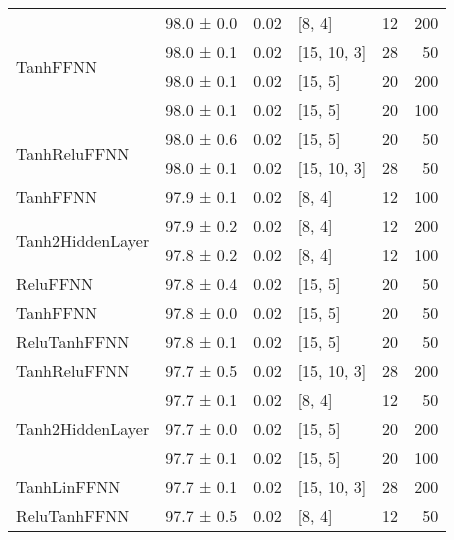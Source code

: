 \begin{longtable}{llrlrr}
 \hline
\multirow{4}{*}{TanhFFNN}           & 98.0 ± 0.0  &  0.02 & [8, 4]         &         12 &      200 \\
                                            & 98.0 ± 0.1  &  0.02 & [15, 10, 3]    &         28 &       50 \\
                                            & 98.0 ± 0.1  &  0.02 & [15, 5]        &         20 &      200 \\
                                            & 98.0 ± 0.1  &  0.02 & [15, 5]        &         20 &      100 \\
 \hline
\multirow{2}{*}{TanhReluFFNN}       & 98.0 ± 0.6  &  0.02 & [15, 5]        &         20 &       50 \\
                                            & 98.0 ± 0.1  &  0.02 & [15, 10, 3]    &         28 &       50 \\
 \hline
TanhFFNN                            & 97.9 ± 0.1  &  0.02 & [8, 4]         &         12 &      100 \\
 \hline
\multirow{2}{*}{Tanh2HiddenLayer}   & 97.9 ± 0.2  &  0.02 & [8, 4]         &         12 &      200 \\
                                            & 97.8 ± 0.2  &  0.02 & [8, 4]         &         12 &      100 \\
 \hline
ReluFFNN                            & 97.8 ± 0.4  &  0.02 & [15, 5]        &         20 &       50 \\
 \hline
TanhFFNN                            & 97.8 ± 0.0  &  0.02 & [15, 5]        &         20 &       50 \\
 \hline
ReluTanhFFNN                        & 97.8 ± 0.1  &  0.02 & [15, 5]        &         20 &       50 \\
 \hline
TanhReluFFNN                        & 97.7 ± 0.5  &  0.02 & [15, 10, 3]    &         28 &      200 \\
 \hline
\multirow{3}{*}{Tanh2HiddenLayer}   & 97.7 ± 0.1  &  0.02 & [8, 4]         &         12 &       50 \\
                                            & 97.7 ± 0.0  &  0.02 & [15, 5]        &         20 &      200 \\
                                            & 97.7 ± 0.1  &  0.02 & [15, 5]        &         20 &      100 \\
 \hline
TanhLinFFNN                         & 97.7 ± 0.1  &  0.02 & [15, 10, 3]    &         28 &      200 \\
 \hline
ReluTanhFFNN                        & 97.7 ± 0.5  &  0.02 & [8, 4]         &         12 &       50 \\

\end{longtable}
